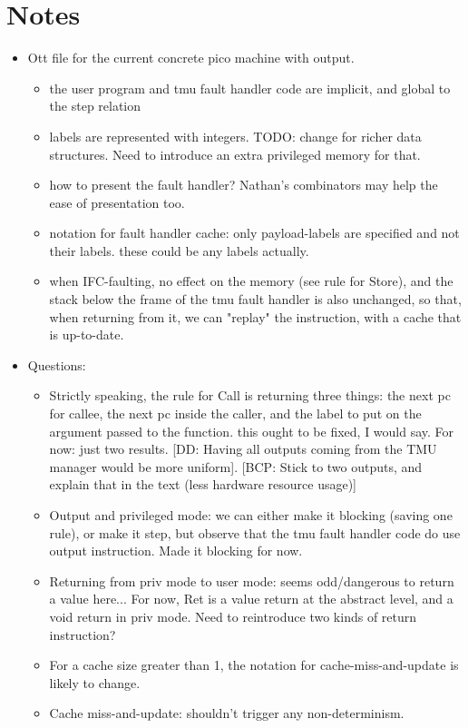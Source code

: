 \documentclass{article}
\newcommand{\comm}[3]{\textcolor{#1}{[#2: #3]}}
\newcommand{\bcp}[1]{\comm{dkred}{BCP}{#1}} %
\newcommand{\dd}[1]{\comm{dkblue}{DD}{#1}} %
\begin{document}
\section*{Notes}

\begin{itemize}
\item Ott file for the current concrete pico machine with output.
  \begin{itemize}
    \item the user program and tmu fault handler code are implicit,
      and global to the step relation
    \item labels are represented with integers. TODO: change for
      richer data structures. Need to introduce an extra privileged
      memory for that.
    \item how to present the fault handler? Nathan's
      combinators may help the ease of presentation too.
    \item notation for fault handler cache: only payload-labels are
      specified and not their labels. these could be any labels actually.
    \item when IFC-faulting, no effect on the memory (see rule for
      Store), and the stack below the frame of the tmu fault handler
      is also unchanged, so that, when returning from it, we can
      "replay" the instruction, with a cache that is up-to-date.
  \end{itemize}
\item Questions:
  \begin{itemize}
    \item Strictly speaking, the rule for Call is returning three
      things: the next pc for callee, the next pc inside the caller,
      and the label to put on the argument passed to the function.
      this ought to be fixed, I would say. For now: just two results.
      \dd{Having all outputs coming from the TMU manager would be more
        uniform}. \bcp{Stick to two outputs, and explain that in the
        text (less hardware resource usage)}
    \item Output and privileged mode: we can either make it blocking
      (saving one rule), or make it step, but observe that the tmu
      fault handler code do use output instruction. Made it blocking
      for now.
    \item Returning from priv mode to user mode: seems odd/dangerous
      to return a value here... For now, Ret is a value return at the
      abstract level, and a void return in priv mode. Need to
      reintroduce two kinds of return instruction?
    \item For a cache size greater than 1, the notation for
      cache-miss-and-update is likely to change.
    \item Cache miss-and-update: shouldn't trigger any non-determinism.
  \end{itemize}
\end{itemize}
\end{document}
